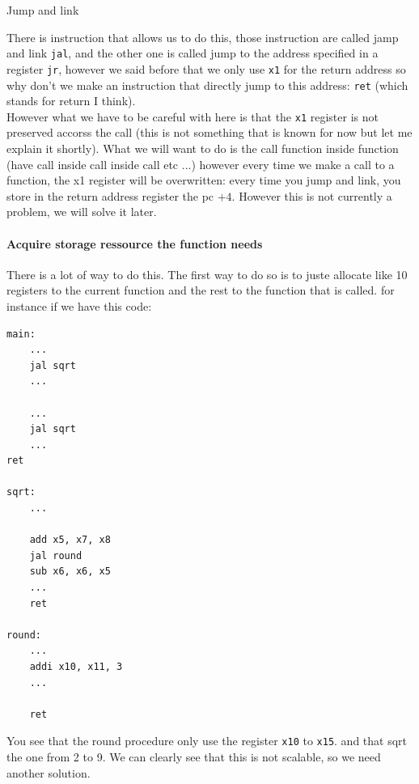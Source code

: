 	\begin{parag}{Jump and link}
		


	There is instruction that allows us to do this, those instruction are called jamp and link \texttt{jal}, and the other one is called jump to the address specified in a register \texttt{jr}, however we said before that we only use \texttt{x1} for the return address so why don't we make an instruction that directly jump to this address: \texttt{ret} (which stands for return I think).\\
	However what we have to be careful with here is that the \texttt{x1} register is not preserved accorss the call (this is not something that is known for now but let me explain it shortly). What we will want to do is the call function inside function (have call inside call inside call etc ...) however every time we make a call to a function, the x1 register will be overwritten: every time you jump and link, you store in the return address register the pc $+ 4$. However this is not currently a problem, we will solve it later.
\paragraph{Acquire storage ressource the function needs}
There is a lot of way to do this. The first way to do so is to juste allocate like 10 registers to the current function and the rest to the function that is called. for instance
if we have this code:
\begin{lstlisting}[language={[RISC-V]Assembler}]
main:
	...
	jal sqrt 
	... 

	... 
	jal sqrt
	...
ret 

sqrt: 
	...

	add x5, x7, x8 
	jal round 
	sub x6, x6, x5 
	...
	ret

round:
	...
	addi x10, x11, 3 
	...

	ret
\end{lstlisting}
You see that the round procedure only use the register \texttt{x10} to \texttt{x15}. and that sqrt the one from 2 to 9. We can clearly see that this is not scalable, so we need another solution.
\end{parag}
